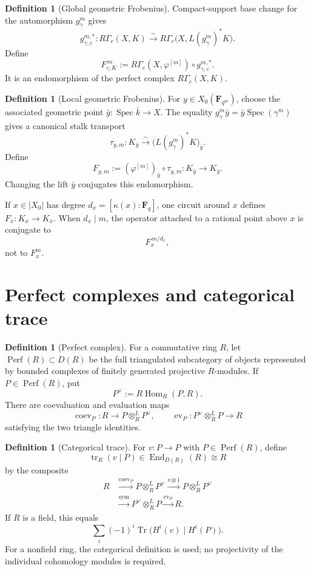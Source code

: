 \documentclass[10pt]{article}
\theoremstyle{definition}
\newtheorem{definition}[theorem]{Definition}
\newcommand{\Fq}{\mathbf F_q}
\newcommand{\Perf}{\operatorname{Perf}}
\newcommand{\Spec}{\operatorname{Spec}}
\newcommand{\Hom}{\operatorname{Hom}}
\newcommand{\End}{\operatorname{End}}
\newcommand{\Tr}{\operatorname{Tr}}
\newcommand{\RGammac}{R\Gamma_c}
\begin{document}
\begin{definition}[Global geometric Frobenius]
Compact-support base change for the automorphism \(g_\gamma^m\) gives
\[
 g_{\gamma,c}^{m,*}:
 \RGammac(X,K)\xrightarrow{\sim}
 \RGammac\bigl(X,L(g_\gamma^m)^*K\bigr).
\]
Define
\[
 F_{c,K}^{\,m}:=
 \RGammac(X,\varphi^{[m]})\circ g_{\gamma,c}^{m,*}.
\]
It is an endomorphism of the perfect complex \(\RGammac(X,K)\).
\end{definition}

\begin{definition}[Local geometric Frobenius]
For \(y\in X_0(\mathbf F_{q^m})\), choose the associated geometric point
\(\bar y:\Spec\bar k\to X\).  The equality
\(g_\gamma^m\bar y=\bar y\Spec(\gamma^m)\) gives a canonical stalk
transport
\[
 \tau_{y,m}:K_{\bar y}\xrightarrow{\sim}
 \bigl(L(g_\gamma^m)^*K\bigr)_{\bar y}.
\]
Define
\[
 F_{y,m}:=
 (\varphi^{[m]})_{\bar y}\circ\tau_{y,m}:K_{\bar y}\to K_{\bar y}.
\]
Changing the lift \(\bar y\) conjugates this endomorphism.

If \(x\in|X_0|\) has degree \(d_x=[\kappa(x):\Fq]\), one circuit around
\(x\) defines \(F_x:K_{\bar x}\to K_{\bar x}\).  When \(d_x\mid m\), the
operator attached to a rational point above \(x\) is conjugate to
\[
 F_x^{\,m/d_x},
\]
not to \(F_x^m\).
\end{definition}

\section{Perfect complexes and categorical trace}

\begin{definition}[Perfect complex]
For a commutative ring \(R\), let \(\Perf(R)\subset D(R)\) be the full
triangulated subcategory of objects represented by bounded complexes of
finitely generated projective \(R\)-modules.  If \(P\in\Perf(R)\), put
\[
 P^\vee:=R\Hom_R(P,R).
\]
There are coevaluation and evaluation maps
\[
 \operatorname{coev}_P:R\to P\otimes_R^LP^\vee,\qquad
 \operatorname{ev}_P:P^\vee\otimes_R^LP\to R
\]
satisfying the two triangle identities.
\end{definition}

\begin{definition}[Categorical trace]
For \(v:P\to P\) with \(P\in\Perf(R)\), define
\[
 \operatorname{tr}_R(v\mid P)\in\End_{D(R)}(R)\cong R
\]
by the composite
\[
\begin{aligned}
R&\xrightarrow{\operatorname{coev}_P}P\otimes_R^LP^\vee
\xrightarrow{v\otimes1}P\otimes_R^LP^\vee\\
&\xrightarrow{\mathrm{sym}}P^\vee\otimes_R^LP
\xrightarrow{\operatorname{ev}_P}R.
\end{aligned}
\]
If \(R\) is a field, this equals
\[
 \sum_i(-1)^i\Tr\bigl(H^i(v)\mid H^i(P)\bigr).
\]
For a nonfield ring, the categorical definition is used; no projectivity of
the individual cohomology modules is required.
\end{definition}
\end{document}
